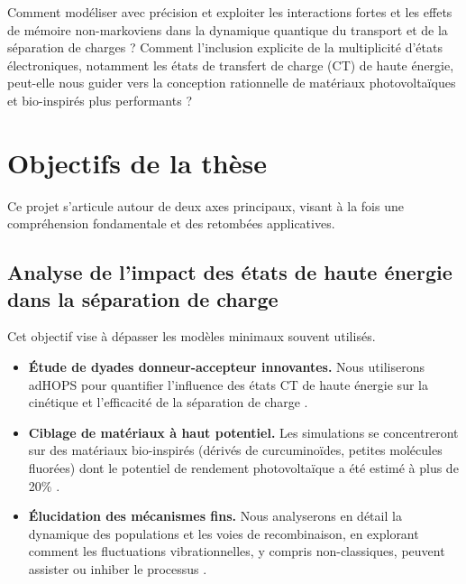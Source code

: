 \documentclass[12pt, a4paper]{article}
\begin{document}
Comment modéliser avec précision et exploiter les interactions fortes et les effets de mémoire non-markoviens dans la dynamique quantique du transport et de la séparation de charges ? Comment l'inclusion explicite de la multiplicité d'états électroniques, notamment les états de transfert de charge (CT) de haute énergie, peut-elle nous guider vers la conception rationnelle de matériaux photovoltaïques et bio-inspirés plus performants ?

\section{Objectifs de la thèse}

Ce projet s'articule autour de deux axes principaux, visant à la fois une compréhension fondamentale et des retombées applicatives.

\subsection{Analyse de l'impact des états de haute énergie dans la séparation de charge}
Cet objectif vise à dépasser les modèles minimaux souvent utilisés.
\begin{itemize}
    \item \textbf{Étude de dyades donneur-accepteur innovantes.} Nous utiliserons adHOPS pour quantifier l'influence des états CT de haute énergie sur la cinétique et l'efficacité de la séparation de charge \cite{lee2015, zhang2022_NFA}.
    
    \item \textbf{Ciblage de matériaux à haut potentiel.} Les simulations se concentreront sur des matériaux bio-inspirés (dérivés de curcuminoïdes, petites molécules fluorées) dont le potentiel de rendement photovoltaïque a été estimé à plus de 20\% \cite{archet2018, firdaus2019, leb2016}.

    \item \textbf{Élucidation des mécanismes fins.} Nous analyserons en détail la dynamique des populations et les voies de recombinaison, en explorant comment les fluctuations vibrationnelles, y compris non-classiques, peuvent assister ou inhiber le processus \cite{oreilly2014, zheng2021, Almazova2024}.
\end{itemize}
\end{document}
